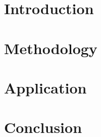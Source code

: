 \documentclass[a4paper,twoside,12pt]{scrbook}
\begin{document}
\pagestyle{empty} %



\tableofcontents %
\cleardoublepage %

\pagestyle{plain} %


\chapter{Introduction}
\label{sec:Introduction}


\chapter{Methodology}
\label{sec:Methodology}





\chapter{Application}
\label{sec:Application}





\chapter{Conclusion}
\label{sec: Conclusion}




\printbibliography

\clearpage
{}
\listoffigures

\clearpage
{}
\listoftables


\appendix
\end{document}
